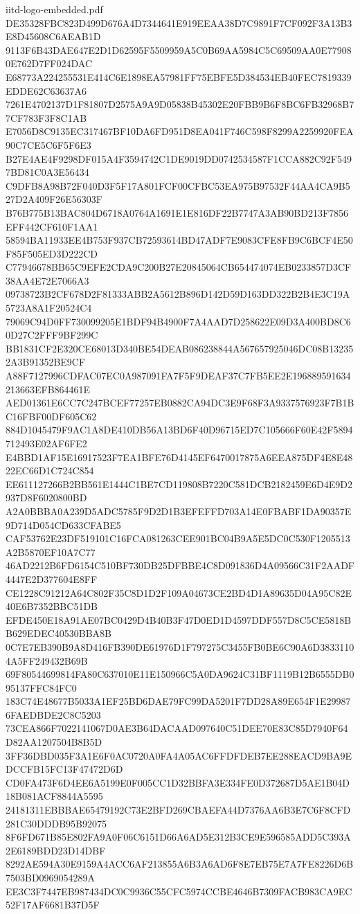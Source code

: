 \begin{filecontents*}[overwrite]{iitd-logo-embedded.pdf}
DE35328FBC823D499D676A4D7344641E919EEAA38D7C9891F7CF092F3A13B3E8D45608C6AEAB1D
9113F6B43DAE647E2D1D62595F5509959A5C0B69AA5984C5C69509AA0E779080E762D7FF024DAC
E68773A224255531E414C6E1898EA57981FF75EBFE5D384534EB40FEC7819339EDDE62C63637A6
7261E4702137D1F81807D2575A9A9D05838B45302E20FBB9B6F8BC6FB32968B77CF783F3F8C1AB
E7056D8C9135EC317467BF10DA6FD951D8EA041F746C598F8299A2259920FEA90C7CE5C6F5F6E3
B27E4AE4F9298DF015A4F3594742C1DE9019DD0742534587F1CCA882C92F5497BD81C0A3E56434
C9DFB8A98B72F040D3F5F17A801FCF00CFBC53EA975B97532F44AA4CA9B527D2A409F26E56303F
B76B775B13BAC804D6718A0764A1691E1E816DF22B7747A3AB90BD213F7856EFF442CF610F1AA1
58594BA11933EE4B753F937CB72593614BD47ADF7E9083CFE8FB9C6BCF4E50F85F505ED3D222CD
C77946678BB65C9EFE2CDA9C200B27E20845064CB654474074EB0233857D3CF38AA4E72E7066A3
09738723B2CF678D2F81333ABB2A5612B896D142D59D163DD322B2B4E3C19A5723A8A1F20524C4
79069C94D0FF730099205E1BDF94B4900F7A4AAD7D258622E09D3A400BD8C60D27C2FFF9BF299C
BB1831CF2E320CE68013D340BE54DEAB086238844A567657925046DC08B132352A3B91352BE9CF
A88F7127996CDFAC07EC0A987091FA7F5F9DEAF37C7FB5EE2E196889591634213663EFB864461E
AED01361E6CC7C247BCEF77257EB0882CA94DC3E9F68F3A9337576923F7B1BC16FBF00DF605C62
884D1045479F9AC1A8DE410DB56A13BD6F40D96715ED7C105666F60E42F5894712493E02AF6FE2
E4BBD1AF15E16917523F7EA1BFE76D4145EF6470017875A6EEA875DF4E8E4822EC66D1C724C854
EE611127266B2BB561E1444C1BE7CD119808B7220C581DCB2182459E6D4E9D2937D8F6020800BD
A2A0BBBA0A239D5ADC5785F9D2D1B3EFEFFD703A14E0FBABF1DA90357E9D714D054CD633CFABE5
CAF53762E23DF519101C16FCA081263CEE901BC04B9A5E5DC0C530F1205513A2B5870EF10A7C77
46AD2212B6FD6154C510BF730DB25DFBBE4C8D091836D4A09566C31F2AADF4447E2D377604E8FF
CE1228C91212A64C802F35C8D1D2F109A04673CE2BD4D1A89635D04A95C82E40E6B7352BBC51DB
EFDE450E18A91AE07BC0429D4B40B3F47D0ED1D4597DDF557D8C5CE5818BB629EDEC40530BBA8B
0C7E7EB390B9A8D416FB390DE61976D1F797275C3455FB0BE6C90A6D38331104A5FF249432B69B
69F80544699814FA80C637010E11E150966C5A0DA9624C31BF1119B12B6555DB095137FFC84FC0
183C74E48677B5033A1EF25BD6DAE79FC99DA5201F7DD28A89E654F1E299876FAEDBDE2C8C5203
73CEA866F7022141067D0AE3B64DACAAD097640C51DEE70E83C85D7940F64D82AA1207504B8B5D
3FF36DBD035F3A1E6F0AC0720A0FA4A05AC6FFDFDEB7EE288EACD9BA9EDCCFB15FC13F47472D6D
CD0FA473F6D4EE6A5199E0F005CC1D32BBFA3E334FE0D372687D5AE1B04D18B081ACF8844A5595
24181311EBBBAE65479192C73E2BFD269CBAEFA44D7376AA6B3E7C6F8CFD281C30DDDB95B92075
8F6FD671B85E802FA9A0F06C6151D66A6AD5E312B3CE9E596585ADD5C393A2E6189BDD23D14DBF
8292AE594A30E9159A4ACC6AF213855A6B3A6AD6F8E7EB75E7A7FE8226D6B7503BD0969054289A
EE3C3F7447EB987434DC0C9936C55CFC5974CCBE4646B7309FACB983CA9EC52F17AF6681B37D5F

\end{filecontents*}
